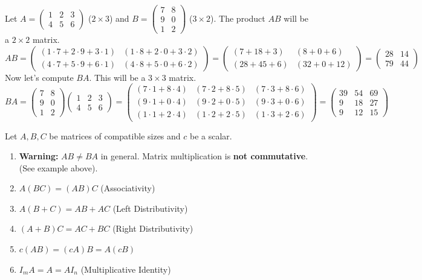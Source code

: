 \begin{example}
Let $A = \begin{pmatrix} 1 & 2 & 3 \\ 4 & 5 & 6 \end{pmatrix}$ ($2 \times 3$) and $B = \begin{pmatrix} 7 & 8 \\ 9 & 0 \\ 1 & 2 \end{pmatrix}$ ($3 \times 2$).
The product $AB$ will be a $2 \times 2$ matrix.
\[
AB = \begin{pmatrix}
(1\cdot 7 + 2\cdot 9 + 3\cdot 1) & (1\cdot 8 + 2\cdot 0 + 3\cdot 2) \\
(4\cdot 7 + 5\cdot 9 + 6\cdot 1) & (4\cdot 8 + 5\cdot 0 + 6\cdot 2)
\end{pmatrix}
= \begin{pmatrix}
(7 + 18 + 3) & (8 + 0 + 6) \\
(28 + 45 + 6) & (32 + 0 + 12)
\end{pmatrix}
= \begin{pmatrix} 28 & 14 \\ 79 & 44 \end{pmatrix}
\]
Now let's compute $BA$. This will be a $3 \times 3$ matrix.
\[
BA = \begin{pmatrix} 7 & 8 \\ 9 & 0 \\ 1 & 2 \end{pmatrix} \begin{pmatrix} 1 & 2 & 3 \\ 4 & 5 & 6 \end{pmatrix}
= \begin{pmatrix}
(7\cdot 1 + 8\cdot 4) & (7\cdot 2 + 8\cdot 5) & (7\cdot 3 + 8\cdot 6) \\
(9\cdot 1 + 0\cdot 4) & (9\cdot 2 + 0\cdot 5) & (9\cdot 3 + 0\cdot 6) \\
(1\cdot 1 + 2\cdot 4) & (1\cdot 2 + 2\cdot 5) & (1\cdot 3 + 2\cdot 6)
\end{pmatrix}
= \begin{pmatrix} 39 & 54 & 69 \\ 9 & 18 & 27 \\ 9 & 12 & 15 \end{pmatrix}
\]
\end{example}

\begin{property}
Let $A, B, C$ be matrices of compatible sizes and $c$ be a scalar.
\begin{enumerate}
    \item \textbf{Warning:} $AB \neq BA$ in general. Matrix multiplication is \textbf{not commutative}. (See example above).
    \item $A(BC) = (AB)C$ (Associativity)
    \item $A(B+C) = AB + AC$ (Left Distributivity)
    \item $(A+B)C = AC + BC$ (Right Distributivity)
    \item $c(AB) = (cA)B = A(cB)$
    \item $I_m A = A = A I_n$ (Multiplicative Identity)
\end{enumerate}
\end{property}

